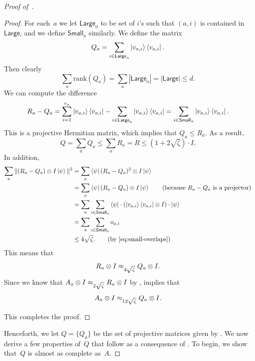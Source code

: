 \begin{proof}[Proof of~]
\begin{proof}
For each~$a$ we let $\mathsf{Large}_a$ to be set of $i$'s such that $(a,i)$ is contained in $\mathsf{Large}$,
and we define $\mathsf{Small}_a$ similarly.
We define the matrix
\begin{equation*}
Q_a = \sum_{i\in \mathsf{Large}_a} \ket{v_{a, i}}\bra{v_{a,i}}.
\end{equation*}
Then clearly
\begin{equation*}
\sum_a \mathrm{rank}(Q_a)
= \sum_a |\mathsf{Large}_a|
= |\mathsf{Large}|
\leq d.
\end{equation*}
We can compute the difference
\begin{equation*}
R_a - Q_a
= \sum_{i=1}^{r_a} \ket{v_{a, i}}\bra{v_{a,i}} - \sum_{i \in \mathsf{Large}_a}  \ket{v_{a, i}}\bra{v_{a,i}}
= \sum_{i\in \mathsf{Small}_a} \ket{v_{a, i}}\bra{v_{a,i}}.
\end{equation*}
This is a projective Hermitian matrix, which implies that $Q_a \leq R_a$.
As a result,
\begin{equation*}
Q = \sum_a Q_a \leq \sum_a R_a = R \leq (1+2\sqrt{\zeta}) \cdot I.
\end{equation*}
In addition,
\begin{align*}
\sum_a \Vert (R_a - Q_a) \ot I \ket{\psi} \Vert^2
&= \sum_a \bra{\psi}(R_a - Q_a)^2 \ot I \ket{\psi}\\
&= \sum_a \bra{\psi}(R_a - Q_a)\ot I \ket{\psi} \tag{because $R_a - Q_a$ is a projector}\\
&= \sum_a \sum_{i \in \mathsf{Small}_a} \bra{\psi} \cdot (\ket{v_{a,i}}\bra {v_{a,i}} \ot I) \cdot\ket{\psi}\\
&= \sum_a \sum_{i \in \mathsf{Small}_a} o_{a, i}\\
&\leq 4\sqrt{\zeta}. \tag{by \Cref{eq:small-overlaps}}
\end{align*}
This means that
\begin{equation*}
R_a \otimes I \approx_{4\sqrt{\zeta}} Q_a \otimes I.
\end{equation*}
Since we know that $A_a \otimes I \approx_{2\sqrt{\zeta}} R_a \otimes I$ by ,
 implies that
\begin{equation*}
A_a \otimes I \approx_{12\sqrt{\zeta}} Q_a \otimes I.
\end{equation*}

This completes the proof.
\end{proof}

Henceforth, we let $Q = \{Q_a\}$ be the set of projective matrices given by .
We now derive a few properties of~$Q$ that follow as a consequence of .
To begin, we show that~$Q$ is almost as complete as~$A$.


\end{proof}

